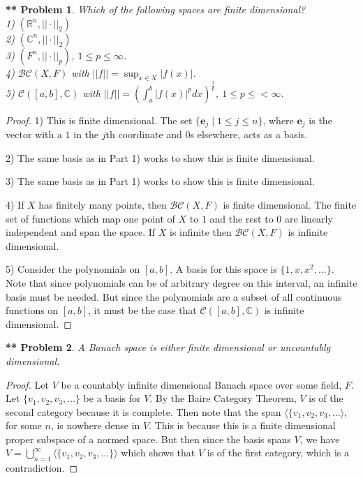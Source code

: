 \documentclass{article}
\newtheorem{**}{** Problem}
\begin{document}
\begin{flushleft}
\begin{**}
Which of the following spaces are finite dimensional?\\
1) $(\mathbb{R}^n, ||\cdot||_2)$\\
2) $(\mathbb{C}^n, ||\cdot||_2)$\\
3) $(F^n, ||\cdot||_p)$, $1 \leq p \leq \infty$.\\
4) $\mathcal{BC}(X, F)$ with $||f|| = \sup_{x \in X} |f(x)|$.\\
5) $\mathcal{C}([a,b], \mathbb{C})$ with $||f|| = \left ( \int_a^b |f(x)|^p dx \right)^{\frac{1}{p}}$, $1 \leq p \leq < \infty$.
\end{**}
\begin{proof}
1) This is finite dimensional. The set $\{\mathbf{e}_j \mid 1 \leq j \leq n\}$, where $\mathbf{e}_j$ is the vector with a $1$ in the $j$th coordinate and $0$s elsewhere, acts as a basis.\newline

2) The same basis as in Part 1) works to show this is finite dimensional.\newline

3) The same basis as in Part 1) works to show this is finite dimensional.\newline

4) If $X$ has finitely many points, then $\mathcal{BC}(X, F)$ is finite dimensional. The finite set of functions which map one point of $X$ to $1$ and the rest to $0$ are linearly independent and span the space. If $X$ is infinite then $\mathcal{BC} (X, F)$ is infinite dimensional.

5) Consider the polynomials on $[a,b]$. A basis for this space is $\{1, x, x^2, \dots\}$. Note that since polynomials can be of arbitrary degree on this interval, an infinite basis must be needed. But since the polynomials are a subset of all continuous functions on $[a,b]$, it must be the case that $\mathcal{C} ([a,b], \mathbb{C})$ is infinite dimensional.
\end{proof}

\begin{**}
A Banach space is either finite dimensional or uncountably dimensional.
\end{**}
\begin{proof}
Let $V$ be a countably infinite dimensional Banach space over some field, $F$. Let $\{v_1, v_2, v_3, \dots\}$ be a basis for $V$. By the Baire Category Theorem, $V$ is of the second category because it is complete. Then note that the span $\langle \{v_1, v_2, v_3, \dots \rangle$, for some $n$, is nowhere dense in $V$. This is because this is a finite dimensional proper subspace of a normed space. But then since the basis spans $V$, we have $V = \bigcup_{n=1}^{\infty} \langle \{v_1, v_2, v_3, \dots\} \rangle$ which shows that $V$ is of the first category, which is a contradiction.
\end{proof}

\end{flushleft}
\end{document}
